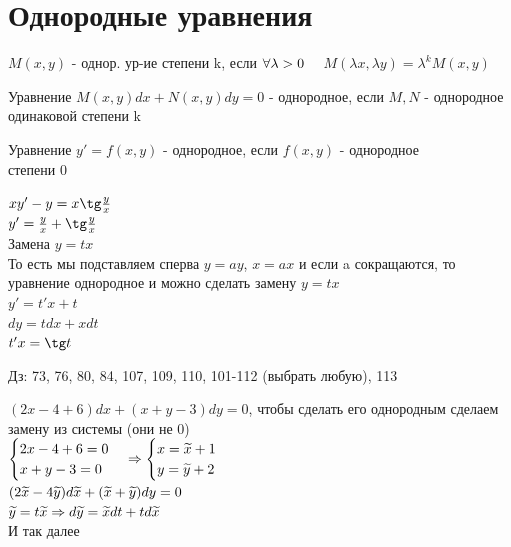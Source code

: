 \documentclass[12pt, fleqn]{article}
\begin{document}
    \section{Однородные уравнения}
    \begin{definition}
        $M(x,y)$ - однор. ур-ие степени k, если $\forall \lambda>0 \quad $ $M(\lambda x, \lambda y) = \lambda^k M(x,y)$
    \end{definition}

    \begin{definition}
        Уравнение $M(x,y) dx + N(x,y) dy=0$ - однородное, если $M,N$ - однородное одинаковой степени k
    \end{definition}

    \begin{definition}
        Уравнение $y'=f(x,y)$ - однородное, если $f(x,y)$ - однородное \\ степени 0
    \end{definition}

    \begin{example}
        $x y'-y=x \tg \frac{y}{x}$\\
        $y'=\frac{y}{x}+\tg \frac{y}{x}$\\
        Замена $y=t x$\\
        То есть мы подставляем сперва $y=ay$, $x=ax$ и если a сокращаются, то уравнение однородное и можно сделать замену $y=tx$\\
        $y'=t' x+t$\\
        $dy=t dx+x dt$\\
        $t' x = \tg t$
    \end{example}

    Дз: 73, 76, 80, 84, 107, 109, 110, 101-112 (выбрать любую), 113

    \begin{example}
        $(2x-4+6)dx+(x+y-3)dy=0$, чтобы сделать его однородным сделаем замену из системы (они не 0)\\
        $\begin{cases} 2x-4+6 = 0 \\ x+y-3=0 \end{cases} \Rightarrow \begin{cases} x=\widetilde{x}+1 \\ y=\widetilde{y}+2 \end{cases}$\\
        $(2\widetilde{x}-4\widetilde{y})d\widetilde{x}+(\widetilde{x}+\widetilde{y})d{y}=0$\\
        $\widetilde{y}=t\widetilde{x} \Rightarrow d\widetilde{y}=\widetilde{x}dt+td\widetilde{x}$\\
        И так далее
    \end{example}
\end{document}
